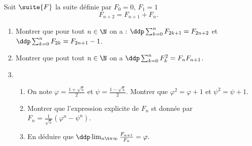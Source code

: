 



\begin{exercice}
Soit $\suite{F}$ la suite définie par $F_0 =0, \, F_1=1 $  
$$ F_{n+2} = F_{n+1} +F_n.$$

\begin{enumerate}
\item Montrer que pour tout $n\in \N$ on a : $\ddp \sum_{k=0}^n F_{2k+1} =F_{2n+2}$
et $\ddp \sum_{k=0}^n F_{2k} =F_{2n+1}-1$.
\item Montrer que pout tout $n\in \N$ on a $\ddp \sum_{k=0}^n F_{k}^2 =F_nF_{n+1}$.
\item \begin{enumerate}
\item On note $\varphi = \frac{1+\sqrt{5}}{2}$ et $\psi=\frac{1-\sqrt{5}}{2}$. Montrer que 
$\varphi^2 =\varphi+1$ et $\psi^2 =\psi+1$.
\item Montrer que l'expression explicite de $F_n$ st donnée par $F_n =\frac{1}{\sqrt{5}}(\varphi^n-\psi^n)$.
\item En déduire que $\ddp \lim_{n\tv \infty} \frac{F_{n+1}}{F_n}=\varphi.$
\end{enumerate}
\end{enumerate}

\end{exercice}


